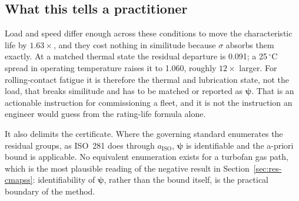 \documentclass[review,times]{elsarticle}
\theoremstyle{definition}
\theoremstyle{remark}
\begin{document}
\subsection*{What this tells a practitioner}
Load and speed differ enough across these conditions to move the characteristic life by
$1.63\times$, and they cost nothing in similitude because $\sigma$ absorbs them exactly. At a matched
thermal state the residual departure is 0.091; a 25\,$^\circ$C spread in operating temperature
raises it to 1.060, roughly $12\times$ larger. For rolling-contact fatigue it is therefore the
thermal and lubrication state, not the load, that breaks similitude and has to be matched or
reported as $\boldsymbol\psi$. That is an actionable instruction for commissioning a fleet, and it
is not the instruction an engineer would guess from the rating-life formula alone.

It also delimits the certificate. Where the governing standard enumerates the residual groups, as
ISO~281 does through $a_{\mathrm{ISO}}$, $\boldsymbol\psi$ is identifiable and the a-priori bound is
applicable. No equivalent enumeration exists for a turbofan gas path, which is the most plausible
reading of the negative result in Section~\ref{sec:res-cmapss}: identifiability of
$\boldsymbol\psi$, rather than the bound itself, is the practical boundary of the method.



\end{document}
